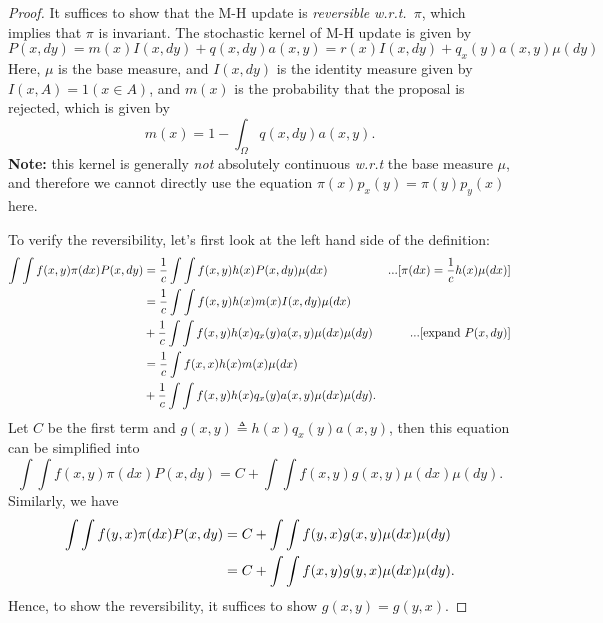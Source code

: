 \documentclass[a4paper,11pt]{article}
\begin{document}
\begin{proof}
    It suffices to show that the M-H update is \emph{reversible} \emph{w.r.t.}~$\pi$, which implies that $\pi$ is invariant.
    The stochastic kernel of M-H update is given by
    \begin{equation}
        P(x, dy) = m(x) I(x, dy) + q(x, dy) a(x, y) = r(x) I(x, dy) + q_x(y) a(x, y) \mu(dy)
    \end{equation}
    Here, $\mu$ is the base measure, and $I(x, dy)$ is the identity measure given by $I(x, A) = 1(x \in A)$, and $m(x)$ is the probability that the proposal is rejected, which is given by
    \begin{equation}
        m(x) = 1 - \int_\Omega q(x, dy) a(x, y). 
    \end{equation}
    \textbf{Note:} this kernel is generally \emph{not} absolutely continuous \emph{w.r.t} the base measure $\mu$, and therefore we cannot directly use the equation $\pi(x) p_x(y) = \pi(y) p_y(x)$ here.
    
    To verify the reversibility, let's first look at the left hand side of the definition:
    \begin{align}
        \int \int f(x, y) \pi(dx) P(x, dy) 
        &= \frac{1}{c} \int \int f(x, y) h(x) P(x, dy) \mu(dx) &  ... [\pi(dx) = \frac{1}{c} h(x) \mu(dx)] \notag \\
        &= \frac{1}{c} \int \int f(x, y) h(x) m(x) I(x, dy) \mu(dx) & \notag \\
        &+ \frac{1}{c} \int \int f(x, y) h(x) q_x(y) a(x, y) \mu(dx) \mu(dy) & ... [\text{expand } P(x, dy)] \notag \\
        &= \frac{1}{c} \int f(x, x) h(x) m(x) \mu(dx) & \notag \\
        &+ \frac{1}{c} \int \int f(x, y) h(x) q_x(y) a(x, y) \mu(dx) \mu(dy). 
    \end{align}
    Let $C$ be the first term and $g(x, y) \triangleq h(x) q_x(y) a(x, y)$, then this equation can be simplified into 
    \begin{equation}
        \int \int f(x, y) \pi(dx) P(x, dy) = C + \int \int f(x, y) g(x, y) \mu(dx) \mu(dy).
    \end{equation}
    Similarly, we have
    \begin{align}
        \int \int f(y, x) \pi(dx) P(x, dy) 
        &= C + \int \int f(y, x) g(x, y) \mu(dx) \mu(dy) \notag \\
        &= C + \int \int f(x, y) g(y, x) \mu(dx) \mu(dy). 
    \end{align}
    Hence, to show the reversibility, it suffices to show $g(x, y) = g(y, x)$. 
    

\end{proof}
\end{document}
